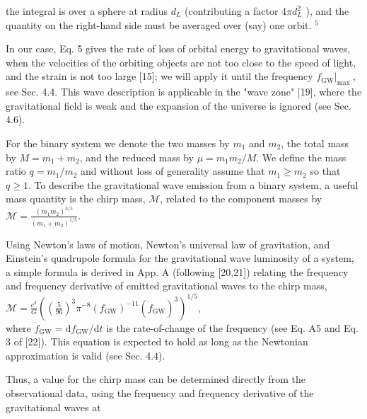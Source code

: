 \documentclass[10pt]{article}
\begin{document}
the integral is over a sphere at radius $d_{L}$ (contributing a factor $4 \pi d_{L}^{2}$ ), and the quantity on the right-hand side must be averaged over (say) one orbit. ${ }^{5}$

In our case, Eq. 5 gives the rate of loss of orbital energy to gravitational waves, when the velocities of the orbiting objects are not too close to the speed of light, and the strain is not too large [15]; we will apply it until the frequency $\left.f_{\mathrm{GW}}\right|_{\text {max }}$, see Sec. 4.4. This wave description is applicable in the "wave zone" [19], where the gravitational field is weak and the expansion of the universe is ignored (see Sec. 4.6).

For the binary system we denote the two masses by $m_{1}$ and $m_{2}$, the total mass by $M=m_{1}+m_{2}$, and the reduced mass by $\mu=m_{1} m_{2} / M$. We define the mass ratio $q=m_{1} / m_{2}$ and without loss of generality assume that $m_{1} \geq m_{2}$ so that $q \geq 1$. To describe the gravitational wave emission from a binary system, a useful mass quantity is the chirp mass, $\mathscr{M}$, related to the component masses by\\
$\mathscr{M}=\frac{\left(m_{1} m_{2}\right)^{3 / 5}}{\left(m_{1}+m_{2}\right)^{1 / 5}}$.

Using Newton's laws of motion, Newton's universal law of gravitation, and Einstein's quadrupole formula for the gravitational wave luminosity of a system, a simple formula is derived in App. A (following [20,21]) relating the frequency and frequency derivative of emitted gravitational waves to the chirp mass,\\
$\mathscr{M}=\frac{c^{3}}{G}\left(\left(\frac{5}{96}\right)^{3} \pi^{-8}\left(f_{\mathrm{GW}}\right)^{-11}\left(\dot{f}_{\mathrm{GW}}\right)^{3}\right)^{1 / 5}$,\\
where $\dot{f}_{\mathrm{GW}}=\mathrm{d} f_{\mathrm{GW}} / \mathrm{d} t$ is the rate-of-change of the frequency (see Eq. A5 and Eq. 3 of [22]). This equation is expected to hold as long as the Newtonian approximation is valid (see Sec. 4.4).

Thus, a value for the chirp mass can be determined directly from the observational data, using the frequency and frequency derivative of the gravitational waves at
\end{document}

